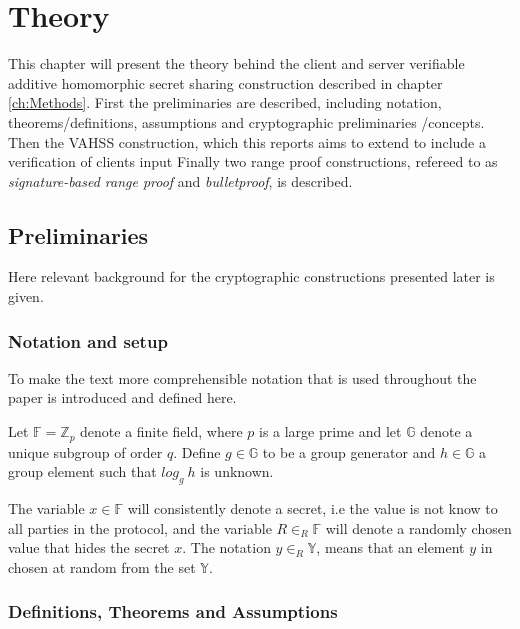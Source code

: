 \chapter{Theory}
\label{ch:theory}
This chapter will present the theory behind the client and server verifiable additive homomorphic secret sharing construction described in chapter \ref{ch:Methods}.  First  the preliminaries are described, including notation, theorems/definitions, assumptions  and cryptographic preliminaries /concepts. Then the VAHSS \cite{SumItUp} \cite{VAHSS} construction, which this reports aims to extend to include  a verification of clients input   Finally two  range proof constructions, refereed to as \textit{signature-based range proof} and \textit{bulletproof}, is described. 


\section{Preliminaries}
Here relevant background for the cryptographic constructions presented later is given. 
\subsection*{Notation and setup}
To make the text more comprehensible notation that is used throughout the paper is introduced and defined here.  



Let $\mathds{F}=\mathds{Z}_p$ denote a finite field, where $p$ is a large prime and let $\mathds{G}$ denote a unique subgroup of order $q$.  Define $g\in\mathds{G}$ to be a group generator and $h\in\mathds{G}$ a group element such that  $log_g\:h$ is unknown. 

The variable $x\in\mathds{F}$ will consistently denote a secret, i.e the value is not know to all parties in the protocol, and the variable $R\in_R\mathds{F}$ will denote a randomly chosen value that hides the secret $x$. The notation $y\in_R\mathds{Y}$, means that an element $y$ in chosen at random from the set $\mathds{Y}$.

\subsection*{Definitions, Theorems and Assumptions}

